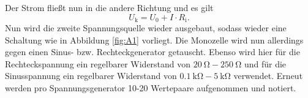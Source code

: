 Der Strom fließt nun in die andere Richtung und es gilt
\begin{equation}
  U_\text{k}=U_\text{0}+I\cdot R_\text{i} .\label{eqn:A2}
\end{equation}
Nun wird die zweite Spannungsquelle wieder ausgebaut, sodass wieder eine Schaltung wie in Abbildung \ref{fig:A1} vorliegt.
Die Monozelle wird nun allerdings gegen einen Sinus- bzw. Rechteckgenerator getauscht.
Ebenso wird hier für die Rechteckspannung ein regelbarer Widerstand von $\SI{20}{\ohm} - \SI{250}{\ohm}$
und für die Sinusspannung ein regelbarer Widerstand von $\SI{0,1}{\kilo \ohm}-\SI{5}{\kilo \ohm}$ verwendet.
Erneut werden pro Spannungsgenerator 10-20 Wertepaare aufgenommen und notiert.
